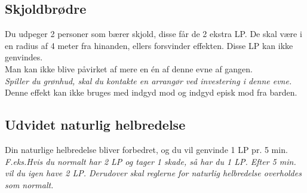 



\subsection*{Skjoldbrødre}
Du udpeger 2 personer som bærer skjold, disse får de 2 ekstra LP. De skal være i en radius af 4 meter fra hinanden, ellers forsvinder effekten. Disse LP kan ikke genvindes.\\
Man kan ikke blive påvirket af mere en én af denne evne af gangen.\\
\emph{Spiller du grønhud, skal du kontakte en arrangør ved investering i denne evne.}\\
Denne effekt kan ikke bruges med indgyd mod og indgyd episk mod fra barden.\\


\subsection*{Udvidet naturlig helbredelse}
Din naturlige helbredelse bliver forbedret, og du vil genvinde 1 LP pr. 5
min.\\ 
\textit{F.eks.\newline Hvis du normalt har 2 LP og tager 1 skade, så har du 1 LP. Efter 5 min. vil du igen have 2 LP. Derudover skal reglerne for naturlig helbredelse overholdes som normalt.}